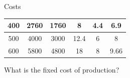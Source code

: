 \documentclass{beamer}
\begin{document}
\begin{frame}[t]{Costs}
\begin{table}[H]
\begin{tabular}{cccccc}
    400      & 2760                                                  & 1760                                                    & 8                                                        & 4.4                                                              & 6.9                                                           \\ \hline
    500      & 4000                                                  & 3000                                                    & 12.4                                                     & 6                                                                & 8                                                             \\ \hline
    600      & 5800                                                  & 4800                                                    & 18                                                       & 8                                                                & 9.66                                                         
    \end{tabular}
    \end{table}
    What is the fixed cost of production?
\end{frame}
\end{document}
